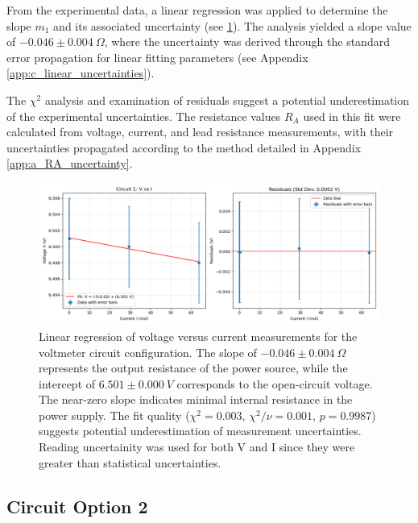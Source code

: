 \documentclass{article} %
\begin{document}
From the experimental data, a linear regression was applied to determine the slope $m_1$ and its associated uncertainty (see \ref{fig:circuit_1_fit}). 
The analysis yielded a slope value of $-0.046 \pm 0.004~\Omega$, where the uncertainty was derived through the standard error propagation for linear fitting parameters (see Appendix \ref{app:c_linear_uncertainties}).

The $\chi^2$ analysis and examination of residuals suggest a potential underestimation of the experimental uncertainties. 
The resistance values $R_A$ used in this fit were calculated from voltage, current, and lead resistance measurements, with their uncertainties propagated according to the method detailed in Appendix \ref{app:a_RA_uncertainty}.
\begin{figure}[htbp]            %
  \centering
  \includegraphics[width=1\linewidth]{Figs/Circuit_1.png}
\caption{Linear regression of voltage versus current measurements for the voltmeter circuit configuration. 
                The slope of $-0.046 \pm 0.004~\Omega$ represents the output resistance of the power source, while the intercept of $6.501 \pm 0.000~V$ corresponds to the open-circuit voltage. 
                The near-zero slope indicates minimal internal resistance in the power supply. 
                The fit quality ($\chi^2 = 0.003$, $\chi^2/\nu = 0.001$, $p = 0.9987$) suggests potential underestimation of measurement uncertainties.
                Reading uncertainity was used for both V and I since they were greater than statistical uncertainties.}    
                \label{fig:circuit_1_fit}
\end{figure}

\subsection{Circuit Option 2}
\end{document}
